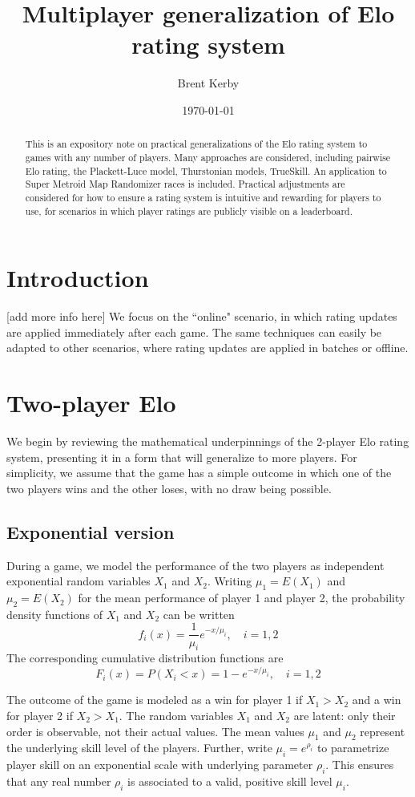 \documentclass{article}
\title{Multiplayer generalization of Elo rating system}
\date{\today}
\author{Brent Kerby}
\begin{document}
	\maketitle
	\begin{abstract}
		This is an expository note on practical generalizations of the Elo rating system to games with any number of players. Many 
		approaches are considered, including pairwise Elo rating, the Plackett-Luce model, Thurstonian models, TrueSkill.
		An application to Super Metroid Map Randomizer races is included.
		Practical adjustments are considered for how to ensure a rating system is intuitive and rewarding for players to use,
		for scenarios in which player ratings are publicly visible on a leaderboard.
	\end{abstract}
	\section{Introduction}
	[add more info here]
	We focus on the ``online" scenario, in which rating updates are applied immediately after each game. The same techniques can easily be adapted to other scenarios, where rating updates are applied in batches or offline.
	\section{Two-player Elo}
	We begin by reviewing the mathematical underpinnings of the 2-player Elo rating system, presenting it in a form that will generalize to more players. For simplicity, we assume that the game has a simple outcome in which one of the two players wins and the other loses, with no draw being possible.
	
	\subsection{Exponential version}
	During a game, we model the performance of the two players as independent exponential random variables $X_1$ and $X_2$. Writing $\mu_1 = E(X_1)$ and $\mu_2 = E(X_2)$ for the mean performance of player 1 and player 2, the probability density functions of $X_1$ and $X_2$ can be written
	$$f_i(x) = \frac1{\mu_i}e^{-x/\mu_i},\quad i=1, 2$$
	The corresponding cumulative distribution functions are
	$$F_i(x) = P(X_i < x) = 1 - e^{-x/\mu_i},\quad i=1, 2$$
	
	The outcome of the game is modeled as a win for player 1 if $X_1 > X_2$ and a win for player 2 if $X_2 > X_1$. The random variables $X_1$ and $X_2$ are latent: only their order is observable, not their actual values. The mean values $\mu_1$ and $\mu_2$ represent the underlying skill level of the players. Further, write $\mu_i = e^{\rho_i}$ to parametrize player skill on an exponential scale with underlying parameter $\rho_i$. This ensures that any real number $\rho_i$ is associated to a valid, positive skill level $\mu_i$. 
	
\end{document}
